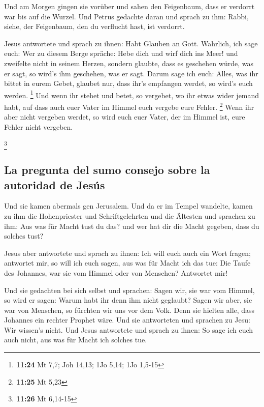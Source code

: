  Und am Morgen gingen sie vorüber und sahen den
Feigenbaum, dass er verdorrt war bis auf die Wurzel.  Und
Petrus gedachte daran und sprach zu ihm: Rabbi, siehe, der Feigenbaum,
den du verflucht hast, ist verdorrt.

 Jesus antwortete und sprach zu ihnen: Habt Glauben an
Gott.  Wahrlich, ich sage euch: Wer zu diesem Berge
spräche: Hebe dich und wirf dich ins Meer! und zweifelte nicht in seinem
Herzen, sondern glaubte, dass es geschehen würde, was er sagt, so wird's
ihm geschehen, was er sagt.  Darum sage ich euch: Alles,
was ihr bittet in eurem Gebet, glaubet nur, dass ihr's empfangen werdet,
so wird's euch werden. \footnote{\textbf{11:24} Mt 7,7; Joh 14,13; 1Jo
  5,14; 1Jo 1,5-15}  Und wenn ihr stehet und betet, so
vergebet, wo ihr etwas wider jemand habt, auf dass auch euer Vater im
Himmel euch vergebe eure Fehler. \footnote{\textbf{11:25} Mt 5,23}
 Wenn ihr aber nicht vergeben werdet, so wird euch euer
Vater, der im Himmel ist, eure Fehler nicht vergeben.

\footnote{\textbf{11:26} Mt 6,14-15}

\hypertarget{la-pregunta-del-sumo-consejo-sobre-la-autoridad-de-jesuxfas}{%
\subsection{La pregunta del sumo consejo sobre la autoridad de
Jesús}\label{la-pregunta-del-sumo-consejo-sobre-la-autoridad-de-jesuxfas}}

 Und sie kamen abermals gen Jerusalem. Und da er im
Tempel wandelte, kamen zu ihm die Hohenpriester und Schriftgelehrten und
die Ältesten  und sprachen zu ihm: Aus was für Macht tust
du das? und wer hat dir die Macht gegeben, dass du solches tust?

 Jesus aber antwortete und sprach zu ihnen: Ich will euch
auch ein Wort fragen; antwortet mir, so will ich euch sagen, aus was für
Macht ich das tue:  Die Taufe des Johannes, war sie vom
Himmel oder von Menschen? Antwortet mir!

 Und sie gedachten bei sich selbst und sprachen: Sagen
wir, sie war vom Himmel, so wird er sagen: Warum habt ihr denn ihm nicht
geglaubt?  Sagen wir aber, sie war von Menschen, so
fürchten wir uns vor dem Volk. Denn sie hielten alle, dass Johannes ein
rechter Prophet wäre.  Und sie antworteten und sprachen
zu Jesu: Wir wissen's nicht. Und Jesus antwortete und sprach zu ihnen:
So sage ich euch auch nicht, aus was für Macht ich solches tue.

